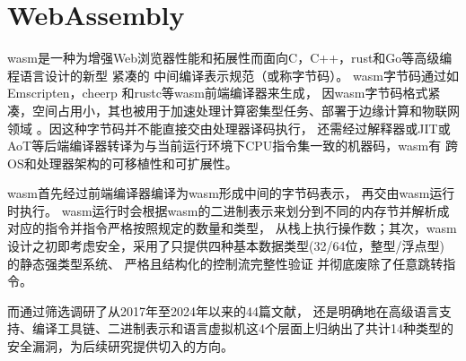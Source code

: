 \documentclass[12pt,a4paper]{article}
\begin{document}
\begin{sloppypar}
	\section{WebAssembly}
	wasm是一种为增强Web浏览器性能和拓展性\cite{haasBringingWebSpeed2017}而面向C，C++，rust和Go等高级编程语言设计的新型
	紧凑的\cite{yanUnderstandingPerformanceWebassembly2021,titzerFastInplaceInterpreter2022,Daniel2019DiscoveringVI}
	中间编译表示规范\cite{wasmCommunityGroup,lehmannWasabiFrameworkDynamically2019,lehmannEverythingOldNew,
	bhansaliFirstLookCode2022,waseemIssuesTheirCauses2024}（或称字节码）。
	wasm字节码通过如Emscripten\cite{FrontEndCompileremscripten}，cheerp\cite{FrontEndCompilerCheerp}
	和rustc等wasm前端编译器来生成\cite{romanoEmpiricalStudyBugs2021}，
	因wasm字节码格式紧凑，空间占用小，其也被用于加速处理计算密集型任务\cite{caoWASMixerBinaryObfuscation2023}、部署于边缘计算和物联网领域
	\cite{rayOverviewWebAssemblyIoT2023}。因这种字节码并不能直接交由处理器译码执行，
	还需经过解释器或JIT或AoT等后端编译器转译为与当前运行环境下CPU指令集一致的机器码\cite[6]{zhangResearchWebAssemblyRuntimes2024}，wasm有
	跨OS和处理器架构的可移植性和可扩展性\cite{lehmannEverythingOldNew,waseemIssuesTheirCauses2024,
		lehmannWasabiFrameworkDynamically2019,JayProvablySafe,zhangResearchWebAssemblyRuntimes2024,rayOverviewWebAssemblyIoT2023}。

	wasm首先经过前端编译器编译为wasm形成中间的字节码表示，
	再交由wasm运行时执行\cite{zhangResearchWebAssemblyRuntimes2024}。
	wasm运行时会根据wasm的二进制表示来划分到不同的内存节并解析成对应的指令\cite{skanehiraWrittingWasmRuntime2024}并指令严格按照规定的数量和类型，
	从栈上执行操作数\cite{wasmcoretech}；其次，wasm设计之初即考虑安全\cite{wasmCommunityGroup}，采用了只提供四种基本数据类型(32/64位，整型/浮点型)
	的静态强类型系统\cite{wasmCommunityGroup,groupWebAssemblySpecification2024,WASMDYPA,haasBringingWebSpeed2017}、
	严格\cite{wasmIntelSGX}且结构化\cite{infoflowctrforwasm,lehmannEverythingOldNew}的控制流完整性验证
	并彻底废除了任意跳转指令\cite{wasmcoretech}。
	
	而\textcite{WebAssemblySummaryOnSecurity}通过筛选调研了从2017年至2024年以来的44篇文献，
	还是明确地在高级语言支持、编译工具链、二进制表示和语言虚拟机这4个层面上归纳出了共计14种类型的安全漏洞，为后续研究提供切入的方向。


\end{sloppypar}
\end{document}
